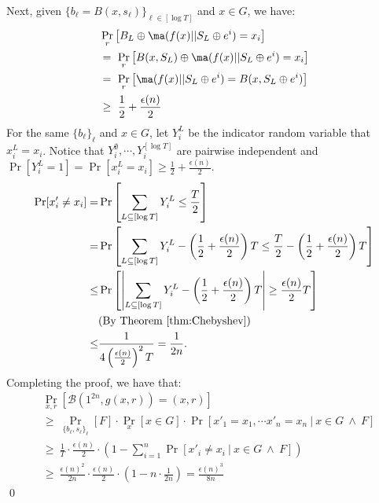 Next, given $\{ b_\ell = B(x,s_\ell) \}_{\ell \in [\log T]}$ and $x\in G$, we have:
\begin{align*}
&\Pr_{r} \left[  B_L \oplus \ma(f(x) || S_L \oplus e^i) = x_i \right] \\
&=~ \Pr_{r} \left[ B(x,S_L) \oplus \ma(f(x) || S_L \oplus e^i) = x_i \right]\\
&=~ \Pr_{r} \left[ \ma(f(x) || S_L \oplus e^i) =  B(x,S_L \oplus e^i) \right]\\
&\geq~ \frac{1}{2} + \frac{\epsilon(n)}{2}
\end{align*}
For the same $\{ b_\ell \}_\ell$ and $x\in G$, let $Y_i^L$ be the indicator random variable that $x_i^L = x_i$.
Notice that $Y_i^\emptyset, \cdots, Y_i^{[\log T]}$ are pairwise independent and $\Pr[Y_i^L=1] = \Pr[x_i^L = x_i] \geq \frac{1}{2} + \frac{\epsilon(n)}{2}$.
\begin{align*}
\Pr[x'_i \neq x_i] =& \Pr\left[\sum_{L \subseteq [\log T]} Y_i^L \leq \frac{T}{2} \right]\\
=& \Pr\left[\sum_{L \subseteq [\log T]} Y_i^L - \left(\frac{1}{2} +  \frac{\epsilon(n)}{2} \right)T \leq \frac{T}{2} - \left(\frac{1}{2} +  \frac{\epsilon(n)}{2} \right)T \right]\\
\leq& \Pr\left[ \left| \sum_{L \subseteq [\log T]} Y_i^L - \left(\frac{1}{2} +  \frac{\epsilon(n)}{2} \right)T \right| \geq \frac{\epsilon(n)}{2} T \right]\\
& \text{(By Theorem~\ref{thm:Chebyshev})}\\
\leq& \frac{1}{4\left( \frac{\epsilon(n)}{2}\right)^2T} = \frac{1}{2n}.
\end{align*}
Completing the proof, we have that:
\begin{align*}
& \Pr_{x,r}[\mathcal{B}(1^{2n}, g(x,r)) = (x,r)]\\
&\geq~  \Pr_{\{ b_\ell, s_\ell \}_\ell}\left[ F \right] \cdot  \Pr_x [x \in G] \cdot \Pr[x'_1 = x_1, \cdots x'_n = x_n ~|~ x \in G ~\wedge~ F]\\
&\geq~ \frac{1}{T} \cdot \frac{\epsilon(n)}{2} \cdot \left(1- \sum_{i=1}^n\Pr[x'_i \neq x_i ~|~  x \in G ~\wedge~ F]\right)\\
&\geq~ \frac{\epsilon(n)^2}{2n} \cdot \frac{\epsilon(n)}{2} \cdot \left(1- n \cdot\frac{1}{2n} \right) =  \frac{\epsilon(n)^3}{8n}
\end{align*}
\qed



